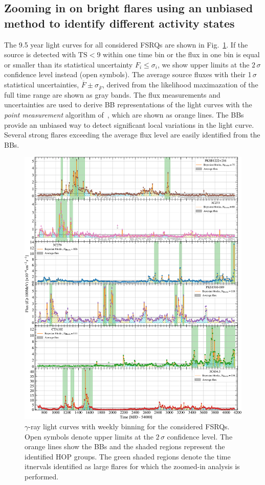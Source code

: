 \documentclass[twocolumn,linenumbers]{aastex62}
\newcommand{\gray}{$\gamma$-ray\xspace}
\begin{document}
\subsection{Zooming in on bright flares using an unbiased method to identify different activity states}
\label{sec:zoom}

The 9.5 year light curves for all considered FSRQs are shown in Fig.~\ref{fig:weekly}. If the source is detected with $\mathrm{TS} < 9$ within one time bin or the flux in one bin is equal or smaller than its statistical uncertainty $F_i \leqslant \sigma_i$, we show upper limits at the $2\,\sigma$ confidence level instead (open symbols). The average source fluxes with their 1$\,\sigma$ statistical uncertainties, $\overline{F} \pm \sigma_{\overline{F}}$, derived from the likelihood maximazation of the full time range are shown as gray bands. 
The flux measurements and uncertainties are used to derive BB representations of the light curves with the \textit{point measurement} algorithm of~\citet[][]{2013ApJ...764..167S}, which are shown as orange lines. 
The BBs provide an unbiased way to detect significant local variations in the light curve.
Several strong flares exceeding the average flux level are easily identified from the BBs. 

\begin{figure}
    \centering
    \includegraphics[width = .9\linewidth]{figures/lc_weekly_tsmin9.pdf}
    \caption{\gray light curves with weekly binning for the considered FSRQs. Open symbols denote upper limits at the $2\,\sigma$ confidence level. The orange lines show the BBs and the shaded regions represent the identified HOP groups. The green shaded regions denote the time itnervals identified as large flares for which the zoomed-in analysis is performed.}
    \label{fig:weekly}
\end{figure}
\end{document}
